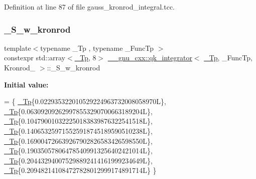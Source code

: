 Definition at line 87 of file gauss\+\_\+kronrod\+\_\+integral.\+tcc.

\mbox{\label{struct____gnu__cxx_1_1qk__integrator_3_01__Tp_00_01__FuncTp_00_01Kronrod__15_01_4_adc8a907d3714406cbb1cf5df42c26d64}} 
\subsubsection{\texorpdfstring{\+\_\+\+S\+\_\+w\+\_\+kronrod}{\_S\_w\_kronrod}}
{\footnotesize\ttfamily template$<$typename \+\_\+\+Tp , typename \+\_\+\+Func\+Tp $>$ \\
constexpr std\+::array$<$\hyperlink{namespace____gnu__cxx_a3b19a9c800ca194374ef9172290f7d79}{\+\_\+\+Tp}, 8$>$ \hyperlink{class____gnu__cxx_1_1qk__integrator}{\+\_\+\+\_\+gnu\+\_\+cxx\+::qk\+\_\+integrator}$<$ \hyperlink{namespace____gnu__cxx_a3b19a9c800ca194374ef9172290f7d79}{\+\_\+\+Tp}, \+\_\+\+Func\+Tp, Kronrod\+\_ $>$\+::\+\_\+\+S\+\_\+w\+\_\+kronrod\hspace{0.3cm}{\ttfamily [static]}}

{\bfseries Initial value\+:}
\begin{DoxyCode}
=
      \{
        \hyperlink{namespace____gnu__cxx_a3b19a9c800ca194374ef9172290f7d79}{\_Tp}\{0.022935322010529224963732008058970L\},
        \hyperlink{namespace____gnu__cxx_a3b19a9c800ca194374ef9172290f7d79}{\_Tp}\{0.063092092629978553290700663189204L\},
        \hyperlink{namespace____gnu__cxx_a3b19a9c800ca194374ef9172290f7d79}{\_Tp}\{0.104790010322250183839876322541518L\},
        \hyperlink{namespace____gnu__cxx_a3b19a9c800ca194374ef9172290f7d79}{\_Tp}\{0.140653259715525918745189590510238L\},
        \hyperlink{namespace____gnu__cxx_a3b19a9c800ca194374ef9172290f7d79}{\_Tp}\{0.169004726639267902826583426598550L\},
        \hyperlink{namespace____gnu__cxx_a3b19a9c800ca194374ef9172290f7d79}{\_Tp}\{0.190350578064785409913256402421014L\},
        \hyperlink{namespace____gnu__cxx_a3b19a9c800ca194374ef9172290f7d79}{\_Tp}\{0.204432940075298892414161999234649L\},
        \hyperlink{namespace____gnu__cxx_a3b19a9c800ca194374ef9172290f7d79}{\_Tp}\{0.209482141084727828012999174891714L\}
      \}
\end{DoxyCode}


